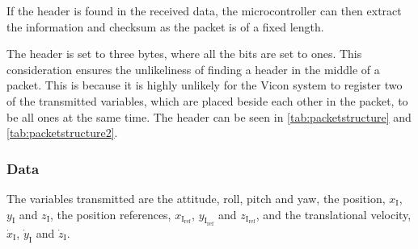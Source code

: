 If the header is found in the received data, the microcontroller can then extract the information and checksum as the packet is of a fixed length. 

The header is set to three bytes, where all the bits are set to ones. This consideration ensures the unlikeliness of finding a header in the middle of a packet. This is because it is highly unlikely for the Vicon system to register two of the transmitted variables, which are placed beside each other in the packet, to be all ones at the same time. The header can be seen in \autoref{tab:packetstructure} and \autoref{tab:packetstructure2}.

\subsubsection{Data}
The variables transmitted are the attitude, roll, pitch and yaw, the position, $x_{\mathrm{I}}$, $y_{\mathrm{I}}$ and $z_{\mathrm{I}}$, the position references, $x_{\mathrm{I_{ref}}}$, $y_{\mathrm{I_{ref}}}$ and $z_{\mathrm{I_{ref}}}$, and the translational velocity, $\dot{x}_{\mathrm{I}}$, $\dot{y}_{\mathrm{I}}$ and $\dot{z}_{\mathrm{I}}$. 


